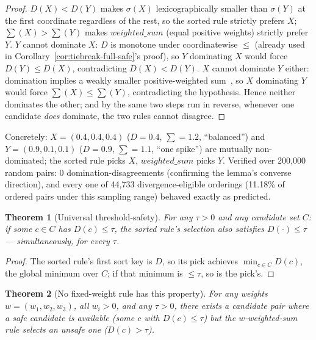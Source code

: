 \documentclass[sigconf,review,anonymous]{acmart}
\newtheorem{theorem}{Theorem}
\begin{document}
\begin{proof}
$D(X) < D(Y)$ makes $\sigma(X)$ lexicographically smaller than $\sigma(Y)$ at the first
coordinate regardless of the rest, so the sorted rule strictly prefers $X$;
$\sum(X) > \sum(Y)$ makes $\mathit{weighted\_sum}$ (equal positive weights) strictly prefer
$Y$. $Y$ cannot dominate $X$: $D$ is monotone under coordinatewise $\le$ (already used in
Corollary~\ref{cor:tiebreak-full-safe}'s proof), so $Y$ dominating $X$ would force
$D(Y) \le D(X)$, contradicting $D(X) < D(Y)$. $X$ cannot dominate $Y$ either: domination
implies a weakly smaller positive-weighted sum~\cite{geoffrion1968proper}, so $X$ dominating
$Y$ would force $\sum(X) \le \sum(Y)$, contradicting the hypothesis. Hence neither dominates
the other; and by the same two steps run in reverse, whenever one candidate \emph{does}
dominate, the two rules cannot disagree.
\end{proof}

Concretely: $X = (0.4, 0.4, 0.4)$ ($D{=}0.4$, $\sum{=}1.2$, ``balanced'') and
$Y = (0.9, 0.1, 0.1)$ ($D{=}0.9$, $\sum{=}1.1$, ``one spike'') are mutually non-dominated; the
sorted rule picks $X$, $\mathit{weighted\_sum}$ picks $Y$. Verified over 200{,}000 random
pairs: 0 domination-disagreements (confirming the lemma's converse direction), and every one
of 44{,}733 divergence-eligible orderings (11.18\% of ordered pairs under this sampling range)
behaved exactly as predicted.

\begin{theorem}[Universal threshold-safety]
\label{thm:threshold-safety}
For any $\tau > 0$ and any candidate set $C$: if some $c \in C$ has $D(c) \le \tau$, the
sorted rule's selection also satisfies $D(\cdot) \le \tau$ --- simultaneously, for every
$\tau$.
\end{theorem}

\begin{proof}
The sorted rule's first sort key is $D$, so its pick achieves $\min_{c \in C} D(c)$, the
global minimum over $C$; if that minimum is $\le \tau$, so is the pick's.
\end{proof}

\begin{theorem}[No fixed-weight rule has this property]
\label{thm:impossibility}
For any weights $w = (w_1, w_2, w_3)$, all $w_i > 0$, and any $\tau > 0$, there exists a
candidate pair where a safe candidate is available (some $c$ with $D(c) \le \tau$) but the
$w$-weighted-sum rule selects an unsafe one ($D(c) > \tau$).
\end{theorem}
\end{document}
